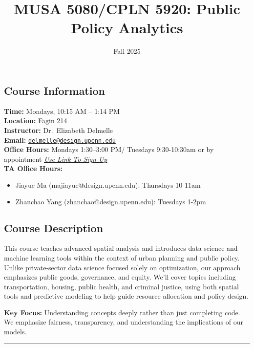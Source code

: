 \documentclass[
  11pt,
]{article}
\title{MUSA 5080/CPLN 5920: Public Policy Analytics}
\subtitle{Fall 2025}
\author{}
\date{}
\providecommand{\tightlist}{%
  \setlength{\itemsep}{0pt}\setlength{\parskip}{0pt}}
\begin{document}
\maketitle


\subsection{Course Information}\label{course-information}

\textbf{Time:} Mondays, 10:15 AM -- 1:14 PM\\
\textbf{Location:} Fagin 214\\
\textbf{Instructor:} Dr.~Elizabeth Delmelle\\
\textbf{Email:}
\href{mailto:delmelle@design.upenn.edu}{\nolinkurl{delmelle@design.upenn.edu}}\\
\textbf{Office Hours:} Mondays 1:30--3:00 PM/ Tuesdays 9:30-10:30am or
by appointment
\href{https://calendly.com/delmelle/open-house-office-hours}{\emph{Use
Link To Sign Up}}\\
\textbf{TA Office Hours:}

\begin{itemize}
\tightlist
\item
  Jiayue Ma (majiayue@design.upenn.edu): Thursdays 10-11am
\item
  Zhanchao Yang (zhanchao@design.upenn.edu): Tuesdays 1-2pm
\end{itemize}

\subsection{Course Description}\label{course-description}

This course teaches advanced spatial analysis and introduces data
science and machine learning tools within the context of urban planning
and public policy. Unlike private-sector data science focused solely on
optimization, our approach emphasizes public goods, governance, and
equity. We'll cover topics including transportation, housing, public
health, and criminal justice, using both spatial tools and predictive
modeling to help guide resource allocation and policy design.

\textbf{Key Focus:} Understanding concepts deeply rather than just
completing code. We emphasize fairness, transparency, and understanding
the implications of our models.

\begin{center}\rule{0.5\linewidth}{0.5pt}\end{center}
\end{document}
